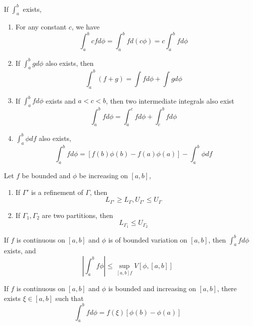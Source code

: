 \documentclass[openany]{book}
\begin{document}
\begin{prop}
    If $\int_a^b$ exists, 
    \begin{enumerate}
        \item  For any constant $c$, we have 
        \begin{equation*}
            \int_a^bcfd\phi=\int_a^bfd(c\phi)=c\int_a^bfd\phi
        \end{equation*}
        \item If $\int_a^bgd\phi$ also exists, then 
         \begin{equation*}
            \int_a^b(f+g)=\int fd\phi+\int gd\phi
        \end{equation*}
        \item If $\int_a^bfd\phi$ exists and $a<c<b$, then two intermediate integrals also exist 
        \begin{equation*}
            \int_a^bfd\phi=\int_a^cfd\phi+\int_c^bfd\phi
        \end{equation*}
        \item $\int_a^b\phi df$ also exists, 
        \begin{equation*}
            \int_a^bfd\phi=[f(b)\phi(b)-f(a)\phi(a)]-\int_a^b\phi df
        \end{equation*}
    \end{enumerate}
\end{prop}
\begin{prop}
    Let $f$ be bounded and $\phi$ be increasing on $[a,b]$, 
    \begin{enumerate}
        \item If $\Gamma'$ is a refinement of $\Gamma$, then 
        \begin{equation*}
            L_{\Gamma'}\geq L_\Gamma, U_{\Gamma'}\leq U_{\Gamma}
        \end{equation*}
        \item If $\Gamma_1,\Gamma_2$ are two partitions, then 
        \begin{equation*}
            L_{\Gamma_1}\leq U_{\Gamma_2}
        \end{equation*}
    \end{enumerate}
\end{prop}
\begin{prop}
    If $f$ is continuous on $[a,b]$ and $\phi$ is of bounded variation on $[a,b]$, then $\int_a^bfd\phi$ exists, and 
    \begin{equation*}
        \left|\int_a^bf\phi\right|\leq\sup_{[a,b]f}V[\phi,[a,b]]
    \end{equation*}
\end{prop}
\begin{thm}
    If $f$ is continuous on $[a,b]$ and $\phi$ is bounded and increasing on $[a,b]$, there exists $\xi\in [a,b]$ such that 
    \begin{equation*}
        \int_a^bfd\phi=f(\xi)[\phi(b)-\phi(a)]
    \end{equation*}
\end{thm}
\end{document}
